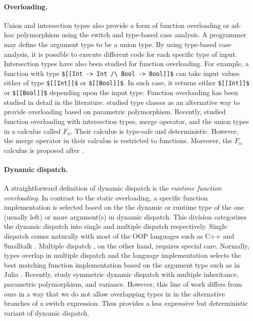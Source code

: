 \paragraph*{Overloading.}
Union and intersection types also provide a form of function overloading or ad-hoc
polymorphism using the switch and type-based case analysis. A programmer
may define the argument type to be a union type. By
using type-based case analysis, it is possible to execute different code
for each specific type of input.  Intersection types have also been
studied for function overloading. For example, a function with type
\lstinline{$[[Int -> Int /\ Bool -> Bool]]$} can take input values either of type
\lstinline{$[[Int]]$} or \lstinline{$[[Bool]]$}.  In such case,
it returns either \lstinline{$[[Int]]$} or \lstinline{$[[Bool]]$}
depending upon the input type.  Function overloading
\citep{castagna1995calculus, cardelli1985understanding, wadler1989make}
has been studied in detail in the literature.
\cite{wadler1989make} studied type classes as an alternative way
to provide overloading based on parametric polymorphism.
Recently, \cite{rioux2023bowtie} studied function overloading with
intersection types, merge operator, and the union types
in a calculus called $F_{\bowtie}$.
Their calculus is type-safe and deterministic.
However, the merge operator in their calculus is restricted
to functions. Moreover, the $F_{\bowtie}$ calculus
is proposed after \cite{rehman_et_al:LIPIcs.ECOOP.2022.25}.


\paragraph{Dynamic dispatch.}
A straightforward definition of dynamic dispatch
\citep{castagna1995calculus,bourdoncle1997type,castagna2014polymorphic,clifton2006multijava}
is the \emph{runtime function overloading}.
In contrast to the static overloading, a specific
function implementation is selected based on the the dynamic or
runtime type of the one (usually left) or more argument(s) in dynamic dispatch.
This division categorizes the dynamic dispatch into single and multiple
dispatch respectively. Single dispatch comes naturally with most of the
OOP languages such as C++ \citep{stroustrup1986overview} and
Smalltalk \citep{goldberg1983smalltalk}.
Multiple dispatch
\citep{castagna1995calculus,bourdoncle1997type,castagna2014polymorphic},
on the other hand, requires special care.
Normally, types overlap in multiple dispatch and
the language implementation selects the best matching function
implementation based on the argument type such as in
Julia \citep{zappa2018julia}.
Recently, \cite{park2019polymorphic} study symmetric dynamic dispatch with
multiple inheritance, parametric polymorphism, and variance.
However, this line of work differs from ours in a way that we do not allow
overlapping types in \name in the alternative branches of a switch expression.
Thus \name provides a less expressive but deterministic variant of dynamic dispatch.


